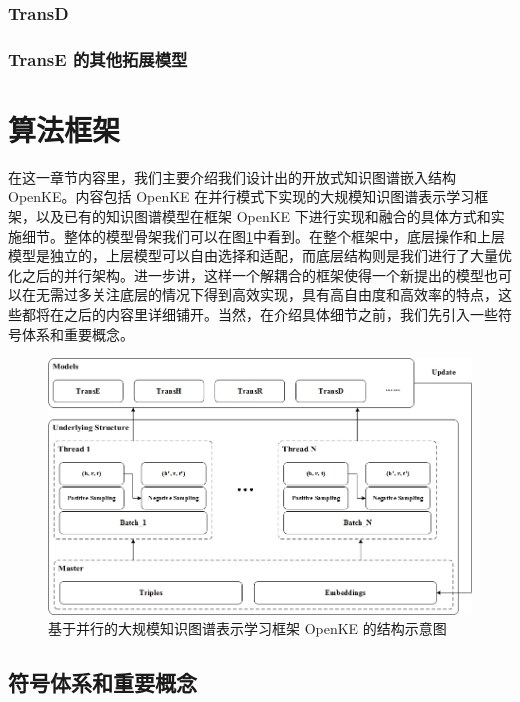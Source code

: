       \subsubsection{TransD}
      \subsubsection{TransE 的其他拓展模型}


\section{算法框架}

在这一章节内容里，我们主要介绍我们设计出的开放式知识图谱嵌入结构 OpenKE。内容包括 OpenKE 在并行模式下实现的大规模知识图谱表示学习框架，以及已有的知识图谱模型在框架 OpenKE 下进行实现和融合的具体方式和实施细节。整体的模型骨架我们可以在图\ref{fig2:openke}中看到。在整个框架中，底层操作和上层模型是独立的，上层模型可以自由选择和适配，而底层结构则是我们进行了大量优化之后的并行架构。进一步讲，这样一个解耦合的框架使得一个新提出的模型也可以在无需过多关注底层的情况下得到高效实现，具有高自由度和高效率的特点，这些都将在之后的内容里详细铺开。当然，在介绍具体细节之前，我们先引入一些符号体系和重要概念。


\begin{figure}[h]
\centering
\includegraphics[width=1.0\linewidth]{figures/ch2/3.jpg}
\caption{基于并行的大规模知识图谱表示学习框架 OpenKE 的结构示意图}
\label{fig2:openke}
\end{figure}

\subsection{符号体系和重要概念}

